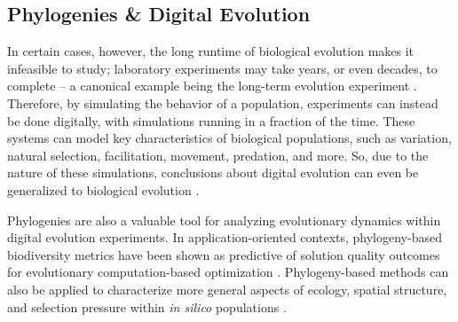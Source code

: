   

\subsection{Phylogenies \& Digital Evolution} \label{sec:introduction:digital}

In certain cases, however, the long runtime of biological evolution makes it infeasible to study; laboratory experiments may take years, or even decades, to complete -- a canonical example being the long-term evolution experiment \citep{wiser2013long}.
Therefore, by simulating the behavior of a population, experiments can instead be done digitally, with simulations running in a fraction of the time.
These systems can model key characteristics of biological populations, such as variation, natural selection, facilitation, movement, predation, and more.
So, due to the nature of these simulations, conclusions about digital evolution can even be generalized to biological evolution \citep{pennock2007models, dolson2021digital}.

Phylogenies are also a valuable tool for analyzing evolutionary dynamics within digital evolution experiments.
In application-oriented contexts, phylogeny-based biodiversity metrics have been shown as predictive of solution quality outcomes for evolutionary computation-based optimization \citep{hernandez2022phylogenetic}.
Phylogeny-based methods can also be applied to characterize more general aspects of ecology, spatial structure, and selection pressure within \textit{in silico} populations \citep{moreno2023toward}.

